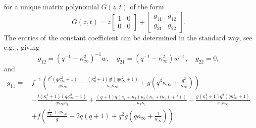 \documentclass[a4paper,reqno,11pt]{amsart}
\numberwithin{equation}{section}
\numberwithin{figure}{section}
\theoremstyle{plain}
\theoremstyle{remark}
\numberwithin{rhp}{section}
\begin{document}
for a unique matrix polynomial $G(z,t)$ of the form
\begin{equation*}
    G(z,t)=z\begin{bmatrix}
        1 & 0\\
        0 & 0
    \end{bmatrix}+\begin{bmatrix}
        g_{11} & g_{12}\\
        g_{21} & g_{22}
    \end{bmatrix}.
\end{equation*}
The entries of the constant coefficient can be determined in the standard way, see e.g. \cite{muganfokas,mugansakka}, giving
\begin{equation*}
    g_{12}=(q^{-1}-\kappa_\infty^2)^{-1} w,\quad 
    g_{21}=(q^{-1}-\kappa_\infty^2) w^{-1},\quad
    g_{22}=0,
\end{equation*}
and
\begin{align*}
    g_{11}=\,& f^{-1}\left(\frac{t^2 \left(q \kappa _{\infty }^2+1\right)}{g \kappa _{\infty }}-\frac{\left(\kappa _0^2+1\right) q t \left(q \kappa _{\infty }^2+1\right)}{\kappa _0 \kappa _{\infty }}+g \left(q^3 \kappa _{\infty }+\frac{q^2}{\kappa _{\infty }}\right)\right)\\
    &-\frac{t \left(\kappa _t^2+1\right) \left(q \kappa _{\infty }^2+1\right)}{g \kappa _{\infty } \kappa _t}+\frac{(q+1) q \left(\kappa _t+\kappa _1 \left(\kappa _t \left(\kappa _1+t \kappa _t\right)+t\right)\right)}{\kappa _1 \kappa _t}-\frac{g \left(\kappa _1^2+1\right) q^2 \left(q \kappa _{\infty }^2+1\right)}{\kappa _1 \kappa _{\infty }}\\
    &+f\left(\frac{\frac{1}{\kappa _{\infty }}+q \kappa _{\infty }}{g}-2 q (q+1)+q^2g \left(q \kappa _{\infty }+\frac{1}{\kappa _{\infty }}\right)\right).
\end{align*}
\end{document}
